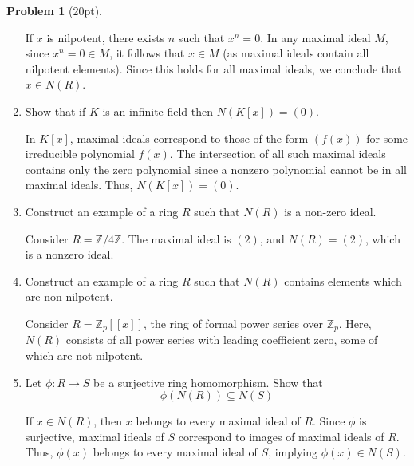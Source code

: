 \documentclass[12pt]{article}
\theoremstyle{definition}
\newtheorem{problem}{Problem}
\begin{document}
\begin{problem}[20pt]
\begin{enumerate}[label=\arabic*.]
            \begin{solution}
            If $x$ is nilpotent, there exists $n$ such that $x^n = 0$. In any maximal ideal $M$, since $x^n = 0 \in M$, it follows that $x \in M$ (as maximal ideals contain all nilpotent elements). Since this holds for all maximal ideals, we conclude that $x \in N(R)$.
            \end{solution}
            
            \item Show that if $K$ is an infinite field then $N(K[x]) = (0)$.
            
            \begin{solution}
            In $K[x]$, maximal ideals correspond to those of the form $(f(x))$ for some irreducible polynomial $f(x)$. The intersection of all such maximal ideals contains only the zero polynomial since a nonzero polynomial cannot be in all maximal ideals. Thus, $N(K[x]) = (0)$.
            \end{solution}

            \item Construct an example of a ring $R$ such that $N(R)$ is a non-zero ideal.
            
            \begin{solution}
            Consider $R = \mathbb{Z}/4\mathbb{Z}$. The maximal ideal is $(2)$, and $N(R) = (2)$, which is a nonzero ideal.
            \end{solution}

            \item Construct an example of a ring $R$ such that $N(R)$ contains elements which are non-nilpotent.
            
            \begin{solution}
            Consider $R = \mathbb{Z}_p[[x]]$, the ring of formal power series over $\mathbb{Z}_p$. Here, $N(R)$ consists of all power series with leading coefficient zero, some of which are not nilpotent.
            \end{solution}

            \item Let $\phi : R \longrightarrow S$ be a surjective ring homomorphism. Show that
            \[
                  \phi(N(R)) \subseteq N(S)
            \]

            \begin{solution}
            If $x \in N(R)$, then $x$ belongs to every maximal ideal of $R$. Since $\phi$ is surjective, maximal ideals of $S$ correspond to images of maximal ideals of $R$. Thus, $\phi(x)$ belongs to every maximal ideal of $S$, implying $\phi(x) \in N(S)$.
            \end{solution}


\end{enumerate}
\end{problem}
\end{document}
